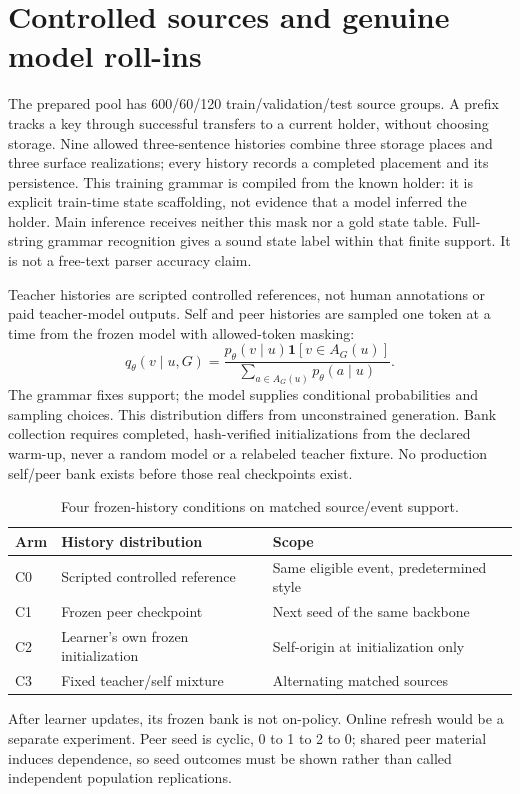 \documentclass[11pt,a4paper]{article}
\begin{document}
\section{Controlled sources and genuine model roll-ins}
The prepared pool has 600/60/120 train/validation/test source groups. A prefix
tracks a key through successful transfers to a current holder, without choosing
storage. Nine allowed three-sentence histories combine three storage places
and three surface realizations; every history records a completed placement
and its persistence. This training grammar is compiled from the known holder: it is explicit
train-time state scaffolding, not evidence that a model inferred the holder.
Main inference receives neither this mask nor a gold state table.
Full-string grammar recognition gives a sound state label
within that finite support. It is not a free-text parser accuracy claim.

Teacher histories are scripted controlled references, not human annotations
or paid teacher-model outputs. Self and peer histories are sampled one token
at a time from the frozen model with allowed-token masking:
\[
q_\theta(v\mid u,G)=
\frac{p_\theta(v\mid u)\mathbf1[v\in A_G(u)]}
{\sum_{a\in A_G(u)}p_\theta(a\mid u)}.
\]
The grammar fixes support; the model supplies conditional probabilities and
sampling choices. This distribution differs from unconstrained generation.
Bank collection requires completed, hash-verified initializations from the
declared warm-up, never a random model or a relabeled teacher fixture.
No production self/peer bank exists before those real checkpoints exist.

\begin{table}[ht]\centering\small
\caption{Four frozen-history conditions on matched source/event support.}
\begin{tabularx}{\linewidth}{lYY}\toprule
Arm & History distribution & Scope\\\midrule
C0 & Scripted controlled reference & Same eligible event, predetermined style\\
C1 & Frozen peer checkpoint & Next seed of the same backbone\\
C2 & Learner's own frozen initialization & Self-origin at initialization only\\
C3 & Fixed teacher/self mixture & Alternating matched sources\\
\bottomrule\end{tabularx}\end{table}

After learner updates, its frozen bank is not on-policy. Online refresh would
be a separate experiment. Peer seed is cyclic, 0 to 1 to 2 to 0; shared peer
material induces dependence, so seed outcomes must be shown rather than called
independent population replications.
\end{document}
